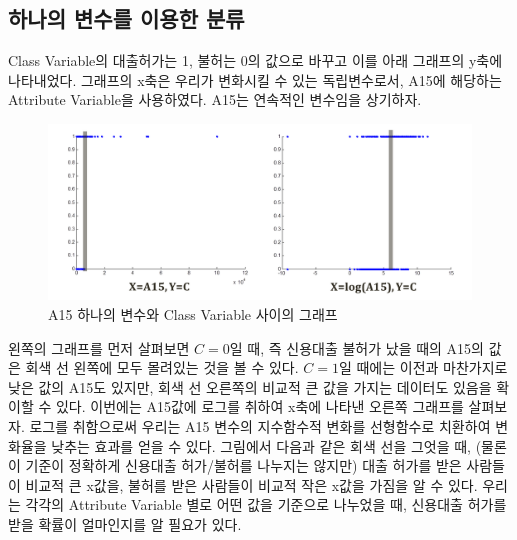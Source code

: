 \documentclass[a4paper]{oblivoir}
\begin{document}
\subsection{하나의 변수를 이용한 분류}
Class Variable의 대출허가는 1, 불허는 0의 값으로 바꾸고 이를 아래 그래프의 y축에 나타내었다. 그래프의 x축은 우리가 변화시킬 수 있는 독립변수로서, A15에 해당하는 Attribute Variable을 사용하였다. A15는 연속적인 변수임을 상기하자. \\
\begin{figure}[ht]
\centering
\includegraphics[scale=0.6]{Classification_1_Variable.png}
\caption{A15 하나의 변수와 Class Variable 사이의 그래프}
\label{Figure 4-4}
\end{figure}

\indent 왼쪽의 그래프를 먼저 살펴보면 $C=0$일 때, 즉 신용대출 불허가 났을 때의 A15의 값은 회색 선 왼쪽에 모두 몰려있는 것을 볼 수 있다. $C=1$일 때에는 이전과 마찬가지로 낮은 값의 A15도 있지만, 회색 선 오른쪽의 비교적 큰 값을 가지는 데이터도 있음을 확이할 수 있다. 이번에는 A15값에 로그를 취하여 x축에 나타낸 오른쪽 그래프를 살펴보자. 로그를 취함으로써 우리는 A15 변수의 지수함수적 변화를 선형함수로 치환하여 변화율을 낮추는 효과를 얻을 수 있다. 그림에서 다음과 같은 회색 선을 그엇을 때, (물론 이 기준이 정확하게 신용대출 허가/불허를 나누지는 않지만) 대출 허가를 받은 사람들이 비교적 큰 x값을, 불허를 받은 사람들이 비교적 작은 x값을 가짐을 알 수 있다. 우리는 각각의 Attribute Variable 별로 어떤 값을 기준으로 나누었을 때, 신용대출 허가를 받을 확률이 얼마인지를 알 필요가 있다.

\end{document}
